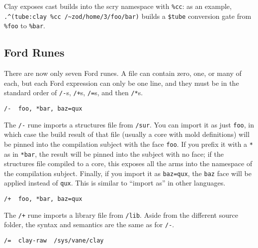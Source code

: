 \documentclass[twoside]{article}
\begin{document}
Clay exposes cast builds into the scry namespace with \lstinline[style=inlinecode]{%cc}: as an example, \lstinline[style=inlinecode]{.^(tube:clay %cc /~zod/home/3/foo/bar)} builds a \lstinline[style=inlinecode]{$tube} conversion gate from \lstinline[style=inlinecode]{%foo} to \lstinline[style=inlinecode]{%bar}.

\subsection{Ford Runes}

There are now only seven Ford runes. A file can contain zero, one, or many of each, but each Ford expression can only be one line, and they must be in the standard order of \lstinline[style=inlinecode]{/-}s, \lstinline[style=inlinecode]{/+}s, \lstinline[style=inlinecode]{/=}s, and then \lstinline[style=inlinecode]{/*}s.

\begin{lstlisting}[style=listingcode]
/-  foo, *bar, baz=qux
\end{lstlisting}

The \lstinline[style=inlinecode]{/-} rune imports a structures file from \lstinline[style=inlinecode]{/sur}. You can import it as just \lstinline[style=inlinecode]{foo}, in which case the build result of that file (usually a core with mold definitions) will be pinned into the compilation subject with the face \lstinline[style=inlinecode]{foo}. If you prefix it with a \lstinline[style=inlinecode]{*} as in \lstinline[style=inlinecode]{*bar}, the result will be pinned into the subject with no face; if the structures file compiled to a core, this exposes all the arms into the namespace of the compilation subject. Finally, if you import it as \lstinline[style=inlinecode]{baz=qux}, the \lstinline[style=inlinecode]{baz} face will be applied instead of \lstinline[style=inlinecode]{qux}. This is similar to ``import as'' in other languages.

\begin{lstlisting}[style=listingcode]
/+  foo, *bar, baz=qux
\end{lstlisting}

The \lstinline[style=inlinecode]{/+} rune imports a library file from \lstinline[style=inlinecode]{/lib}. Aside from the different source folder, the syntax and semantics are the same as for \lstinline[style=inlinecode]{/-}.

\begin{lstlisting}[style=listingcode]
/=  clay-raw  /sys/vane/clay
\end{lstlisting}
\end{document}

